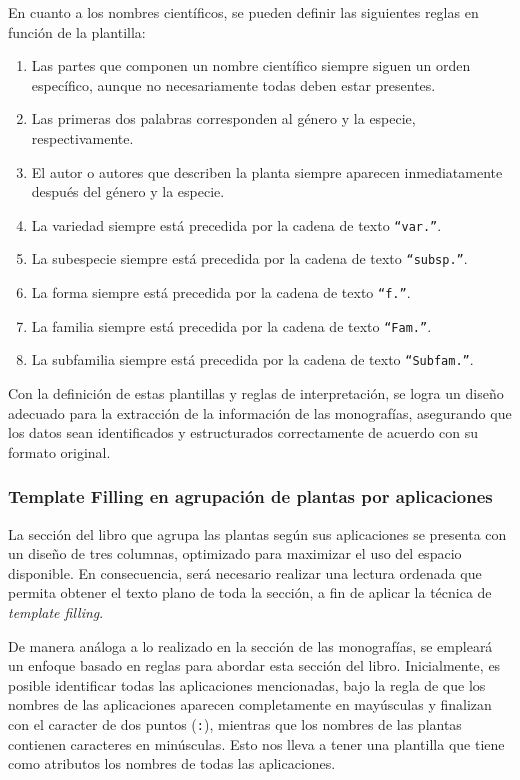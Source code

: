 En cuanto a los nombres científicos, se pueden definir las siguientes reglas en función de la plantilla:
\begin{enumerate}
    \item Las partes que componen un nombre científico siempre siguen un orden específico, aunque no necesariamente todas deben estar presentes.
    \item Las primeras dos palabras corresponden al género y la especie, respectivamente.
    \item El autor o autores que describen la planta siempre aparecen inmediatamente después del género y la especie.
    \item La variedad siempre está precedida por la cadena de texto \texttt{``var.''}.
    \item La subespecie siempre está precedida por la cadena de texto \texttt{``subsp.''}.
    \item La forma siempre está precedida por la cadena de texto \texttt{``f.''}.
    \item La familia siempre está precedida por la cadena de texto \texttt{``Fam.''}.
    \item La subfamilia siempre está precedida por la cadena de texto \texttt{``Subfam.''}.
\end{enumerate}

Con la definición de estas plantillas y reglas de interpretación, se logra un diseño adecuado para 
la extracción de la información de las monografías, asegurando que los datos sean identificados y 
estructurados correctamente de acuerdo con su formato original.


\subsubsection{Template Filling en agrupación de plantas por aplicaciones}
La sección del libro que agrupa las plantas según sus aplicaciones se presenta con un diseño de 
tres columnas, optimizado para maximizar el uso del espacio disponible. En consecuencia, será 
necesario realizar una lectura ordenada que permita obtener el texto plano de toda la sección, 
a fin de aplicar la técnica de \textit{template filling}.

De manera análoga a lo realizado en la sección de las monografías, se empleará un enfoque basado 
en reglas para abordar esta sección del libro. Inicialmente, es posible identificar todas las aplicaciones 
mencionadas, bajo la regla de que los nombres de las aplicaciones aparecen completamente en mayúsculas y 
finalizan con el caracter de dos puntos (\texttt{:}), mientras que los nombres de las plantas contienen caracteres en minúsculas.
Esto nos lleva a tener una plantilla que tiene como atributos los nombres de todas las aplicaciones.

